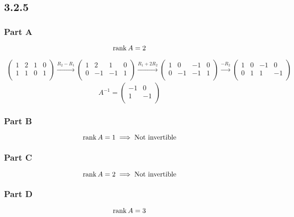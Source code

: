 \documentclass[12pt,titlepage]{extarticle}
\begin{document}
\subsection*{3.2.5}
\subsubsection*{Part A}
\[
    \rank A = 2
\]

\begin{align*}
    \left(\begin{array}{cccc}1&2&1&0\\1&1&0&1\\\end{array}\right) \xrightarrow{R_2 - R_1}
    \left(\begin{array}{cccc}1&2&1&0\\0&-1&-1&1\\\end{array}\right) \xrightarrow{R_1 + 2R_2}
    \left(\begin{array}{cccc}1&0&-1&0\\0&-1&-1&1\\\end{array}\right) \xrightarrow{-R_2}
    \left(\begin{array}{cccc}1&0&-1&0\\0&1&1&-1\\\end{array}\right)
\end{align*}
\[
    A^{-1} = \left(\begin{array}{cc}-1&0\\1&-1\\\end{array}\right)
\]

\subsubsection*{Part B}
\[
    \rank A = 1 \implies \text{Not invertible}
\]

\subsubsection*{Part C}
\[
    \rank A = 2 \implies \text{Not invertible}
\]

\subsubsection*{Part D}
\[
    \rank A = 3
\]
\end{document}
